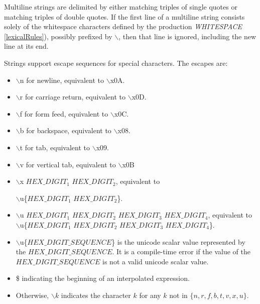 \documentclass{article}
\begin{document}
\LMHash{}
Multiline strings are delimited by either matching triples of single quotes or matching triples of double quotes. If the first line of a multiline string consists solely of the whitespace characters defined by the production {\em WHITESPACE}  \ref{lexicalRules}), possibly prefixed by $\backslash$, then that line is ignored, including the new line at its end.

 
 

\LMHash{}
Strings support escape sequences for special characters. The escapes are:
\begin{itemize}
\item  $\backslash$n for newline, equivalent to $\backslash$x0A.
\item $\backslash$r for carriage return, equivalent to $\backslash$x0D.
\item $\backslash$f for form feed, equivalent to $\backslash$x0C.
\item $\backslash$b for backspace, equivalent to $\backslash$x08.
\item $\backslash$t for tab, equivalent to $\backslash$x09.
\item $\backslash$v for vertical tab, equivalent to $\backslash$x0B
\item $\backslash$x $HEX\_DIGIT_1$ $HEX\_DIGIT_2$, equivalent to 

$\backslash$u\{$HEX\_DIGIT_1$ $HEX\_DIGIT_2$\}.
\item $\backslash$u $HEX\_DIGIT_1$ $HEX\_DIGIT_2$ $HEX\_DIGIT_3$ $HEX\_DIGIT_4$, equivalent to $\backslash$u\{$HEX\_DIGIT_1$ $HEX\_DIGIT_2$ $HEX\_DIGIT_3$ $HEX\_DIGIT_4$\}.
\item $\backslash$u\{$HEX\_DIGIT\_SEQUENCE$\} is the unicode scalar value represented by the $HEX\_DIGIT\_SEQUENCE$. It is a compile-time error if the value of the $HEX\_DIGIT\_SEQUENCE$ is not a valid unicode scalar value.
\item \$ indicating the beginning of an interpolated expression.
\item Otherwise, $\backslash k$ indicates the character $k$ for any $k$ not in $\{n, r, f, b, t, v, x, u\}$.
 \end{itemize}
\end{document}
